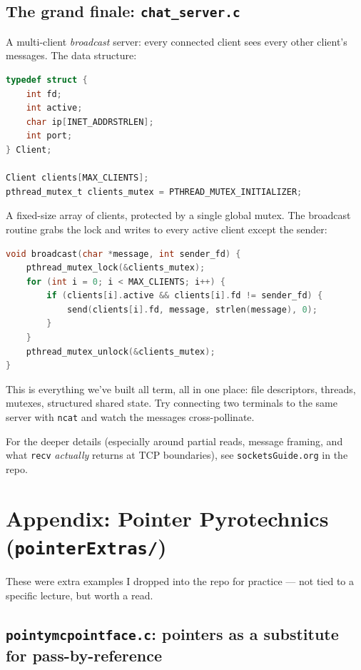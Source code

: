 \documentclass[11pt]{article}
\begin{document}
\subsection*{The grand finale: \texttt{chat\_server.c}}

A multi-client \emph{broadcast} server: every connected client sees
every other client's messages. The data structure:

\begin{lstlisting}[language=C]
typedef struct {
    int fd;
    int active;
    char ip[INET_ADDRSTRLEN];
    int port;
} Client;

Client clients[MAX_CLIENTS];
pthread_mutex_t clients_mutex = PTHREAD_MUTEX_INITIALIZER;
\end{lstlisting}

A fixed-size array of clients, protected by a single global mutex.
The broadcast routine grabs the lock and writes to every active
client except the sender:

\begin{lstlisting}[language=C]
void broadcast(char *message, int sender_fd) {
    pthread_mutex_lock(&clients_mutex);
    for (int i = 0; i < MAX_CLIENTS; i++) {
        if (clients[i].active && clients[i].fd != sender_fd) {
            send(clients[i].fd, message, strlen(message), 0);
        }
    }
    pthread_mutex_unlock(&clients_mutex);
}
\end{lstlisting}

This is everything we've built all term, all in one place: file
descriptors, threads, mutexes, structured shared state. Try
connecting two terminals to the same server with \texttt{ncat} and
watch the messages cross-pollinate.

For the deeper details (especially around partial reads, message
framing, and what \texttt{recv} \emph{actually} returns at TCP
boundaries), see \texttt{socketsGuide.org} in the repo.

\section{Appendix: Pointer Pyrotechnics (\texttt{pointerExtras/})}

These were extra examples I dropped into the repo for practice ---
not tied to a specific lecture, but worth a read.

\subsection*{\texttt{pointymcpointface.c}: pointers as a substitute for pass-by-reference}
\end{document}
